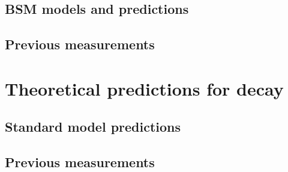 \subsection{BSM models and predictions}
\subsection{Previous measurements}

\section{Theoretical predictions for \decay{\Bp}{\Dsp\Kp\Km} decay}
\subsection{Standard model predictions}
\subsection{Previous measurements}



